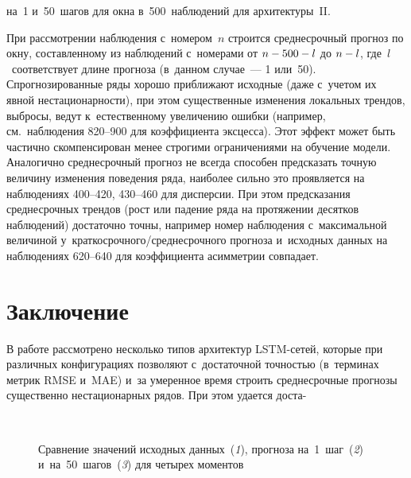 \begin{multicols}{2}

\noindent
 на~1 и~50~шагов для окна 
в~500~наблюдений для архитектуры~{II}.

 При рассмотрении наблюдения 
с~номером~$n$ строится среднесрочный прогноз по окну, со\-став\-лен\-но\-му из 
наблюдений с~номерами от $n \hm- 500\hm - l$ до $n\hm - l$, 
где~$l$~соответствует длине прогноза (в~данном случае~--- 1 или~50). 
Спрогнозированные ряды хорошо приближают исходные (даже с~учетом их 
явной нестационарности), при этом существенные изменения локальных 
трендов, выбросы, ведут к~естественному увеличению ошибки (например, см.\
 наблюдения 820--900 для коэффициента эксцесса). Этот эффект может быть
  частично скомпенсирован менее строгими ограничениями на обуче\-ние модели. 
  Аналогично среднесрочный прогноз не всегда способен предсказать 
  точную величину изменения поведения ряда, наиболее сильно это 
  проявляется на наблюдениях 400--420, 430--460 
  для дисперсии. При этом предсказания среднесрочных трендов (рост 
  или падение ряда на протяжении десятков наблюдений) достаточно точны,
   например номер наблюдения с~максимальной величиной 
   у~крат\-ко\-сроч\-но\-го/сред\-не\-сроч\-но\-го прогноза и~исходных 
   данных на наблюдениях 620--640 для коэффициента асимметрии совпадает.

\vspace*{-12pt}

\section{Заключение}

В работе рассмотрено несколько типов ар\-хи\-тектур LSTM-се\-тей, 
которые при различных кон\-фи\-гурациях позволяют с~достаточной 
точностью
 (в~терминах метрик RMSE и~MAE) и~за умеренное время 
строить среднесрочные прогнозы существенно нестационарных рядов. 
При этом удается доста-\linebreak\vspace*{-12pt}

\pagebreak

\end{multicols}

\begin{figure*}
  \vspace*{1pt}
    \begin{center}  
  \mbox{%
 \epsfxsize=163.054mm 
 }

{\small
Сравнение значений исходных данных~(\textit{1}), прогноза на~1~шаг~(\textit{2}) 
и~на~50~шагов~(\textit{3})  для четырех моментов}
\end{center}
\vspace*{-9pt}
\end{figure*}


